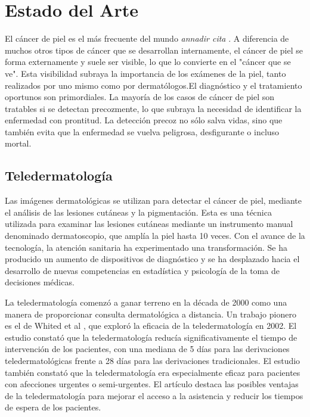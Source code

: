 \chapter{Estado del Arte}\label{chapter:state-of-the-art}

El cáncer de piel es el más frecuente del mundo \textit{annadir cita} . A diferencia de muchos otros tipos de cáncer que se 
desarrollan internamente, el cáncer de piel se forma externamente y suele ser visible, lo que lo convierte en el "cáncer que se ve". Esta visibilidad subraya 
la importancia de los exámenes de la piel, tanto realizados por uno mismo como por dermatólogos.El diagnóstico y el tratamiento oportunos son primordiales. 
La mayoría de los casos de cáncer de piel son tratables si se detectan precozmente, lo que subraya la necesidad de identificar la enfermedad con prontitud. 
La detección precoz no sólo salva vidas, sino que también evita que la enfermedad se vuelva peligrosa, desfigurante o incluso mortal.

\section*{Teledermatología}

Las imágenes dermatológicas se utilizan para detectar el cáncer de piel, mediante el análisis de las lesiones cutáneas y la pigmentación. Esta es una técnica 
utilizada para examinar las lesiones cutáneas mediante un instrumento manual denominado dermatoscopio, que amplía la piel hasta 10 veces. Con el avance de la 
tecnología, la atención sanitaria ha experimentado una transformación. Se ha producido un aumento de dispositivos de diagnóstico y se ha desplazado hacia el 
desarrollo de nuevas competencias en estadística y psicología de la toma de decisiones médicas.

La teledermatología comenzó a ganar terreno en la década de 2000 como una manera de proporcionar consulta dermatológica a distancia. Un trabajo pionero 
es el de Whited et al , que exploró la eficacia de la teledermatología en 2002. El estudio constató que la teledermatología 
reducía significativamente el tiempo de intervención de los pacientes, con una mediana de 5 días para las derivaciones teledermatológicas frente a 28 días para 
las derivaciones tradicionales. El estudio también constató que la teledermatología era especialmente eficaz para pacientes con afecciones urgentes o semi-urgentes. 
El artículo destaca las posibles ventajas de la teledermatología para mejorar el acceso a la asistencia y reducir los tiempos de espera de los pacientes.


